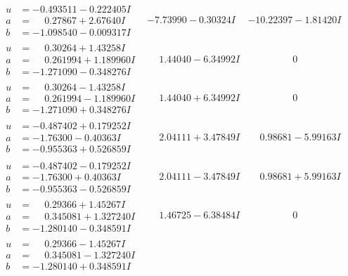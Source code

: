 \documentclass[1p]{elsarticle_modified}
\theoremstyle{definition}
\begin{document}
$$\begin{array}{c|c|c}
\begin{aligned}
u &= -0.493511 - 0.222405 I \\
a &= \phantom{-}0.27867 + 2.67640 I \\
b &= -1.098540 - 0.009317 I\end{aligned}
 & -7.73990 - 0.30324 I & -10.22397 - 1.81420 I \\ \hline\begin{aligned}
u &= \phantom{-}0.30264 + 1.43258 I \\
a &= \phantom{-}0.261994 + 1.189960 I \\
b &= -1.271090 - 0.348276 I\end{aligned}
 & \phantom{-}1.44040 - 6.34992 I & \phantom{-0.000000 } 0 \\ \hline\begin{aligned}
u &= \phantom{-}0.30264 - 1.43258 I \\
a &= \phantom{-}0.261994 - 1.189960 I \\
b &= -1.271090 + 0.348276 I\end{aligned}
 & \phantom{-}1.44040 + 6.34992 I & \phantom{-0.000000 } 0 \\ \hline\begin{aligned}
u &= -0.487402 + 0.179252 I \\
a &= -1.76300 - 0.40363 I \\
b &= -0.955363 + 0.526859 I\end{aligned}
 & \phantom{-}2.04111 + 3.47849 I & \phantom{-}0.98681 - 5.99163 I \\ \hline\begin{aligned}
u &= -0.487402 - 0.179252 I \\
a &= -1.76300 + 0.40363 I \\
b &= -0.955363 - 0.526859 I\end{aligned}
 & \phantom{-}2.04111 - 3.47849 I & \phantom{-}0.98681 + 5.99163 I \\ \hline\begin{aligned}
u &= \phantom{-}0.29366 + 1.45267 I \\
a &= \phantom{-}0.345081 + 1.327240 I \\
b &= -1.280140 - 0.348591 I\end{aligned}
 & \phantom{-}1.46725 - 6.38484 I & \phantom{-0.000000 } 0 \\ \hline\begin{aligned}
u &= \phantom{-}0.29366 - 1.45267 I \\
a &= \phantom{-}0.345081 - 1.327240 I \\
b &= -1.280140 + 0.348591 I\end{aligned}

\end{array}$$
\end{document}
